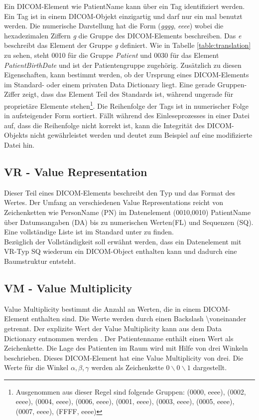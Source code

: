 Ein DICOM-Element wie PatientName kann über ein Tag identifiziert werden. Ein Tag ist in einem DICOM-Objekt einzigartig und darf nur ein mal benutzt werden. Die numerische Darstellung hat die Form (\textit{gggg}, \textit{eeee}) wobei die hexadezimalen Ziffern \textit{g} die Gruppe des DICOM-Elements beschreiben. Das \textit{e} beschreibt das Element der Gruppe \textit{g} definiert. Wie in Tabelle  \ref{table:translation} zu sehen, steht 0010 für die Gruppe \textit{Patient} und 0030 für das Element \textit{PatientBirthDate} und ist der Patientengruppe zugehörig. Zusätzlich zu diesen Eigenschaften, kann bestimmt werden, ob der Ursprung eines DICOM-Elements im Standard- oder einem privaten Data Dictionary liegt. Eine gerade Gruppen-Ziffer zeigt, dass das Element Teil des Standards ist, während ungerade für proprietäre Elemente stehen\footnote{Ausgenommen aus dieser Regel sind folgende Gruppen: (0000, eeee), (0002, eeee), (0004, eeee), (0006, eeee), (0001, eeee), (0003, eeee), (0005, eeee), (0007, eeee), (FFFF, eeee)}\cite[7.1]{dicom:structure}. Die Reihenfolge der Tags ist in numerischer Folge in aufsteigender Form sortiert. Fällt während des Einleseprozesses in einer Datei auf, dass die Reihenfolge nicht korrekt ist, kann die Integrität des DICOM-Objekts nicht gewährleistet werden und deutet zum Beispiel auf eine modifizierte Datei hin.\\

\subsection{VR - Value Representation}
Dieser Teil eines DICOM-Elements beschreibt den Typ und das Format des Wertes\cite[6.2]{dicom:structure}. Der Umfang an verschiedenen Value Representations reicht von Zeichenketten wie PersonName (PN) im Datenelement (0010,0010) PatientName über Datumsangaben (DA) bis zu numerischen Werten(FL) und Sequenzen (SQ). Eine vollständige Liste ist im Standard unter \cite[Table 6.2.1]{dicom:structure} zu finden.\\
Bezüglich der Vollständigkeit soll erwähnt werden, dass ein Datenelement mit VR-Typ SQ wiederum ein DICOM-Object enthalten kann und dadurch eine Baumstruktur entsteht.

\subsection{VM - Value Multiplicity}
Value Multiplicity bestimmt die Anzahl an Werten, die in einem DICOM-Element enthalten sind. Die Werte werden durch einen Backslash \textbackslash voneinander getrennt. Der explizite Wert der Value Multiplicity kann aus dem Data Dictionary entnommen werden \cite[6.4]{dicom:structure}. Der Patientenname enthält einen Wert als Zeichenkette. Die Lage des Patienten im Raum wird mit Hilfe von drei Winkeln beschrieben. Dieses DICOM-Element hat eine Value Multiplicity von drei. Die Werte für die Winkel $\alpha, \beta, \gamma$ werden als Zeichenkette \textit{$0\backslash0\backslash1$} dargestellt.

